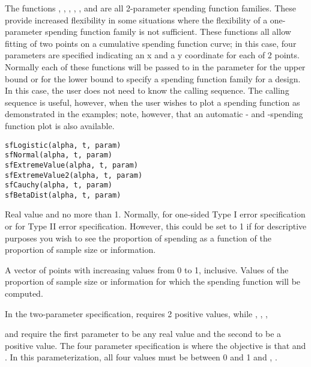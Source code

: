 \begin{Description}\relax
The functions , , , , , 
and  are all 2-parameter spending function families.
These provide increased flexibility in some situations where the flexibility of a one-parameter spending function 
family is not sufficient.
These functions all allow fitting of two points on a cumulative spending function curve; in this case, four parameters
are specified indicating an x and a y coordinate for each of 2 points.
Normally each of these functions will be passed to  in the parameter 
 for the upper bound or
 for the lower bound to specify a spending function family for a design.
In this case, the user does not need to know the calling sequence.
The calling sequence is useful, however, when the user wishes to plot a spending function as demonstrated in the examples; note, however, that an automatic - and -spending function plot is also available.
\end{Description}
\begin{Usage}
\begin{verbatim}
sfLogistic(alpha, t, param)
sfNormal(alpha, t, param)
sfExtremeValue(alpha, t, param)
sfExtremeValue2(alpha, t, param)
sfCauchy(alpha, t, param)
sfBetaDist(alpha, t, param)
\end{verbatim}
\end{Usage}
\begin{Arguments}
\begin{ldescription}
\item[\code{alpha}] Real value  and no more than 1. Normally, 
 for one-sided Type I error specification
or  for Type II error specification. However, this could be set to 1 if for descriptive purposes
you wish to see the proportion of spending as a function of the proportion of sample size or information.
\item[\code{t}] A vector of points with increasing values from 0 to 1, inclusive. Values of the proportion of 
sample size or information for which the spending function will be computed.
\item[\code{param}] In the two-parameter specification,  requires 2 positive values, while
, , ,

 and  require the first parameter 
to be any real value and the second to be a positive value. 
The four parameter specification is 
where the objective is that  and .
In this parameterization, all four values must be between 0 and 1 and , .
\end{ldescription}
\end{Arguments}
